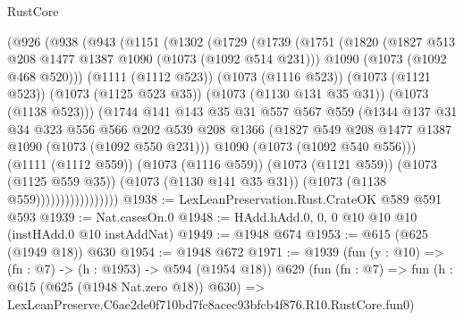 \begin{lexlean}{RustCore}
\begin{coremodule}
                  (@926
                    (@938
                      (@943
                        (@1151
                          (@1302
                            (@1729
                              (@1739
                                (@1751
                                  (@1820
                                    (@1827 @513 @208 @1477 @1387 @1090 (@1073 (@1092 @514 @231)))
                                    @1090
                                    (@1073 (@1092 @468 @520)))
                                  (@1111 (@1112 @523))
                                  (@1073 (@1116 @523))
                                  (@1073 (@1121 @523))
                                  (@1073 (@1125 @523 @35))
                                  (@1073 (@1130 @131 @35 @31))
                                  (@1073 (@1138 @523)))
                                (@1744
                                  @141
                                  @143
                                  @35
                                  @31
                                  @557
                                  @567
                                  @559
                                  (@1344
                                    @137
                                    @31
                                    @34
                                    @323
                                    @556
                                    @566
                                    @202
                                    @539
                                    @208
                                    @1366
                                    (@1827 @549 @208 @1477 @1387 @1090 (@1073 (@1092 @550 @231)))
                                    @1090
                                    (@1073 (@1092 @540 @556)))
                                  (@1111 (@1112 @559))
                                  (@1073 (@1116 @559))
                                  (@1073 (@1121 @559))
                                  (@1073 (@1125 @559 @35))
                                  (@1073 (@1130 @141 @35 @31))
                                  (@1073 (@1138 @559)))))))))))))))))
@1938 := LexLeanPreservation.Rust.CrateOK @589 @591 @593
@1939 := Nat.casesOn.{0}
@1948 := HAdd.hAdd.{0, 0, 0} @10 @10 @10 (instHAdd.{0} @10 instAddNat)
@1949 := @1948 @674
@1953 := @615 (@625 (@1949 @18)) @630
@1954 := @1948 @672
@1971 := @1939
    (fun (y : @10) => (fn : @7) -> (h : @1953) -> @594 (@1954 @18))
    @629
    (fun (fn : @7) =>
    fun (h : @615 (@625 (@1948 Nat.zero @18)) @630) =>
    LexLeanPreserve.C6ae2de0f710bd7fc8acec93bfcb4f876.R10.RustCore.fun0)

\end{coremodule}
\end{lexlean}
